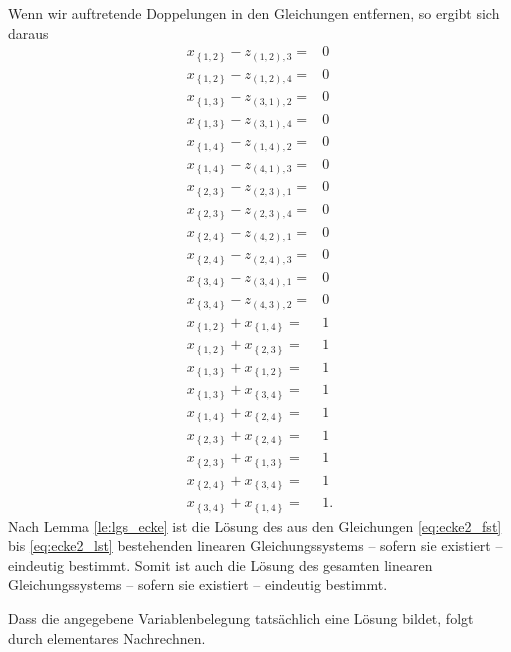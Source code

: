 \documentclass[10p,a4paper,BCOR = 12mm, DIV=15]{scrbook}
\begin{document}
\begin{bew}
Wenn wir auftretende Doppelungen in den Gleichungen entfernen, so ergibt sich daraus
{
\allowdisplaybreaks
\begin{align}
x_{\left\{1, 2\right\}} - z_{\left(1, 2\right), 3} = & 0 \nonumber \\
x_{\left\{1, 2\right\}} - z_{\left(1, 2\right), 4} = & 0 \nonumber \\
x_{\left\{1, 3\right\}} - z_{\left(3, 1\right), 2} = & 0 \nonumber \\
x_{\left\{1, 3\right\}} - z_{\left(3, 1\right), 4} = & 0 \nonumber \\
x_{\left\{1, 4\right\}} - z_{\left(1, 4\right), 2} = & 0 \nonumber \\
x_{\left\{1, 4\right\}} - z_{\left(4, 1\right), 3} = & 0 \nonumber \\
x_{\left\{2, 3\right\}} - z_{\left(2, 3\right), 1} = & 0 \nonumber \\
x_{\left\{2, 3\right\}} - z_{\left(2, 3\right), 4} = & 0 \nonumber \\
x_{\left\{2, 4\right\}} - z_{\left(4, 2\right), 1} = & 0 \nonumber \\
x_{\left\{2, 4\right\}} - z_{\left(2, 4\right), 3} = & 0 \nonumber \\
x_{\left\{3, 4\right\}} - z_{\left(3, 4\right), 1} = & 0 \nonumber \\
x_{\left\{3, 4\right\}} - z_{\left(4, 3\right), 2} = & 0 \nonumber \\
x_{\left\{1, 2\right\}} + x_{\left\{1, 4\right\}} = & 1 \label{eq:ecke2_fst} \\
x_{\left\{1, 2\right\}} + x_{\left\{2, 3\right\}} = & 1 \\
x_{\left\{1, 3\right\}} + x_{\left\{1, 2\right\}} = & 1 \\
x_{\left\{1, 3\right\}} + x_{\left\{3, 4\right\}} = & 1 \\
x_{\left\{1, 4\right\}} + x_{\left\{2, 4\right\}} = & 1 \\
x_{\left\{2, 3\right\}} + x_{\left\{2, 4\right\}} = & 1 \\
x_{\left\{2, 3\right\}} + x_{\left\{1, 3\right\}} = & 1 \\
x_{\left\{2, 4\right\}} + x_{\left\{3, 4\right\}} = & 1 \\
x_{\left\{3, 4\right\}} + x_{\left\{1, 4\right\}} = & 1. \label{eq:ecke2_lst}
\end{align}
}
Nach Lemma \ref{le:lgs_ecke} ist die Lösung des aus den Gleichungen \eqref{eq:ecke2_fst} bis \eqref{eq:ecke2_lst} bestehenden linearen Gleichungssystems -- sofern sie existiert -- eindeutig bestimmt. Somit ist auch die Lösung des gesamten linearen Gleichungssystems -- sofern sie existiert -- eindeutig bestimmt.

Dass die angegebene Variablenbelegung tatsächlich eine Lösung bildet, folgt durch elementares Nachrechnen.
\end{bew}
\end{document}
